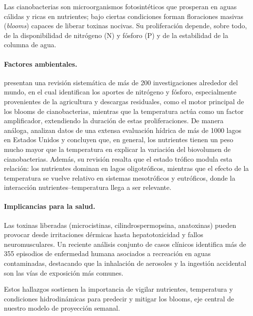 \documentclass[
  11pt,
  pdftitle=TFI - Tschopp Joaquín S.,
  pdfauthor=Tschopp Joaquín S.,
  pdfcreator=LaTeX with hyperref,
]{report}  %
\begin{document}
Las cianobacterias son microorganismos fotosintéticos que prosperan en
aguas cálidas y ricas en nutrientes; bajo ciertas condiciones forman
floraciones masivas (\textit{blooms}) capaces de liberar toxinas
nocivas.  Su proliferación depende, sobre todo, de la disponibilidad de
nitrógeno (N) y fósforo (P) y de la estabilidad de la columna de agua.

\paragraph{Factores ambientales.}  
\cite{Igwaran2024} presentan una revisión sistemática de más de 200 investigaciones alrededor del mundo, en el cual identifican los aportes de nitrógeno y fósforo, especialmente provenientes de la agricultura y descargas residuales, como el motor principal de los blooms de cianobacterias, mientras que la temperatura actúa como un factor amplificador, extendiendo la duración de estas proliferaciones.  
De manera análoga,  \cite{Rigosi2014} analizan datos de una extensa evaluación hídrica de más de 1000 lagos en Estados Unidos y concluyen que, en general, los nutrientes tienen un peso mucho mayor que la temperatura en explicar la variación del biovolumen de cianobacterias. Además, su revisión resalta que el estado trófico modula esta relación: los nutrientes dominan en lagos oligotróficos, mientras que el efecto de la temperatura se vuelve relativo en sistemas mesotróficos y eutróficos, donde la interacción nutrientes–temperatura llega a ser relevante.

\paragraph{Implicancias para la salud.}
Las toxinas liberadas (microcistinas, cilindrospermopsina, anatoxinas)
pueden provocar desde irritaciones dérmicas hasta hepatotoxicidad y
fallos neuromusculares.  Un reciente análisis conjunto de casos clínicos
\citep{Backer2024} identifica más de 355 episodios de enfermedad
humana asociados a recreación en aguas contaminadas, destacando que la
inhalación de aerosoles y la ingestión accidental son las vías de
exposición más comunes.

Estos hallazgos sostienen la importancia de vigilar nutrientes,
temperatura y condiciones hidrodinámicas para predecir y mitigar los
blooms, eje central de nuestro modelo de proyección semanal.

\end{document}
